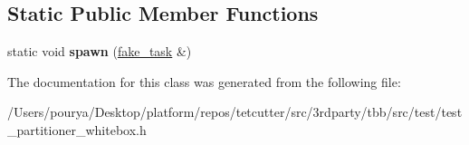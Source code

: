 \subsection*{Static Public Member Functions}
\begin{DoxyCompactItemize}
\item 
\hypertarget{classtbb_1_1fake__task_add20cde29cef1e7008525ca63d1f6900}{}static void {\bfseries spawn} (\hyperlink{classtbb_1_1fake__task}{fake\+\_\+task} \&)\label{classtbb_1_1fake__task_add20cde29cef1e7008525ca63d1f6900}

\end{DoxyCompactItemize}


The documentation for this class was generated from the following file\+:\begin{DoxyCompactItemize}
\item 
/\+Users/pourya/\+Desktop/platform/repos/tetcutter/src/3rdparty/tbb/src/test/test\+\_\+partitioner\+\_\+whitebox.\+h\end{DoxyCompactItemize}
